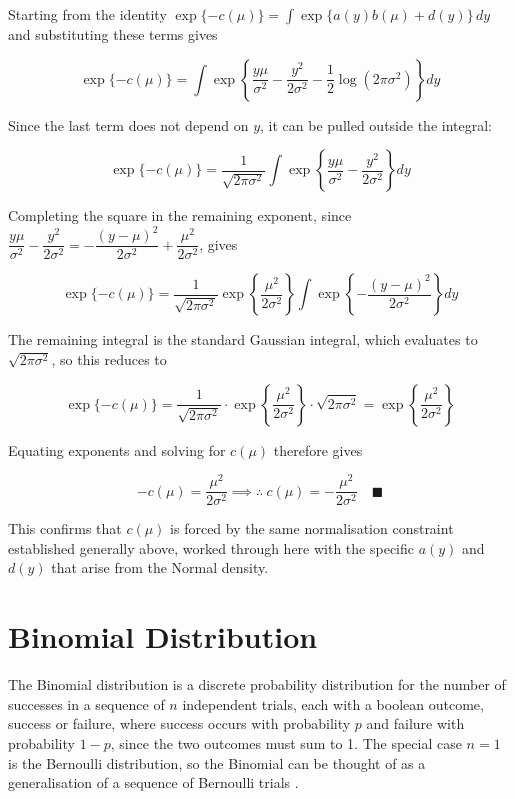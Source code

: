 Starting from the identity $\exp\{-c(\mu)\} = \int\exp\{a(y)b(\mu)+d(y)\}\,dy$ and substituting these terms gives
\begin{mathbox}
\[
\exp\{-c(\mu)\} = \int \exp\left\{\frac{y\mu}{\sigma^2}-\frac{y^2}{2\sigma^2}-\frac{1}{2}\log(2\pi\sigma^2)\right\}dy
\]
\end{mathbox}
Since the last term does not depend on $y$, it can be pulled outside the integral:
\begin{mathbox}
\[
\exp\{-c(\mu)\} = \frac{1}{\sqrt{2\pi\sigma^2}}\int \exp\left\{\frac{y\mu}{\sigma^2}-\frac{y^2}{2\sigma^2}\right\}dy
\]
\end{mathbox}
Completing the square in the remaining exponent, since $\dfrac{y\mu}{\sigma^2}-\dfrac{y^2}{2\sigma^2} = -\dfrac{(y-\mu)^2}{2\sigma^2}+\dfrac{\mu^2}{2\sigma^2}$, gives
\begin{mathbox}
\[
\exp\{-c(\mu)\} = \frac{1}{\sqrt{2\pi\sigma^2}}\exp\left\{\frac{\mu^2}{2\sigma^2}\right\}\int\exp\left\{-\frac{(y-\mu)^2}{2\sigma^2}\right\}dy
\]
\end{mathbox}
The remaining integral is the standard Gaussian integral, which evaluates to $\sqrt{2\pi\sigma^2}$, so this reduces to
\begin{mathbox}
\[
\exp\{-c(\mu)\} = \frac{1}{\sqrt{2\pi\sigma^2}}\cdot\exp\left\{\frac{\mu^2}{2\sigma^2}\right\}\cdot\sqrt{2\pi\sigma^2} = \exp\left\{\frac{\mu^2}{2\sigma^2}\right\}
\]
\end{mathbox}
Equating exponents and solving for $c(\mu)$ therefore gives
\begin{mathbox}
\[
-c(\mu) = \frac{\mu^2}{2\sigma^2} \implies \therefore\ c(\mu) = -\frac{\mu^2}{2\sigma^2}\quad \blacksquare
\]
\end{mathbox}
This confirms that $c(\mu)$ is forced by the same normalisation constraint established generally above, worked through here with the specific $a(y)$ and $d(y)$ that arise from the Normal density.

\section{Binomial Distribution}
The Binomial distribution is a discrete probability distribution for the number of successes in a sequence of $n$ independent trials, each with a boolean outcome, success or failure, where success occurs with probability $p$ and failure with probability $1-p$, since the two outcomes must sum to 1. The special case $n=1$ is the Bernoulli distribution, so the Binomial can be thought of as a generalisation of a sequence of Bernoulli trials \citep{casella2002}.


